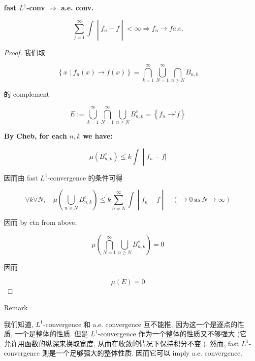 \documentclass{qlnotes-export}
\begin{document}
\begin{proposition}{\textbf{fast \(L^{1}\)-conv \(\Longrightarrow\) a.e. conv.}}\label{prop-05-integration-of-real-and-complex-functions-fast-l-1-conv-implies-a-e-conv}

\[\left. \sum\limits_{j = 1}^{\infty}\int \middle| f_{n} - f \middle| < \infty\Longrightarrow f_{n}\rightarrow f a.e. \right.\]

\end{proposition}

\begin{proof}

我们取

\[\left\{ {x \mid f_{n}(x)\rightarrow f(x)} \right\} = \bigcap\limits_{k = 1}^{\infty}\bigcup\limits_{N = 1}^{\infty}\bigcap\limits_{n \geq N}B_{n,k}\]

的 complement

\[E := \bigcup\limits_{k = 1}^{\infty}\bigcap\limits_{N = 1}^{\infty}\bigcup\limits_{n \geq N}B_{n,k}^{c} = \left\{ {f_{n}\operatorname{\rightarrow\not{}}f} \right\}\]

\textbf{By Cheb, for each \(n,k\) we have:}

\[\left. \mu(B_{n,k}^{c}) \leq k\int \middle| f_{n} - f| \right.\]

因而由 fast \(L^{1}\)-convergence 的条件可得

\[\left. \forall k\forall N,\quad\mu(\bigcup\limits_{n \geq N}B_{n,k}^{c}) \leq k\sum\limits_{n = N}^{\infty}\int \middle| f_{n} - f \middle| \quad(\rightarrow 0\ \text{as}\ N\rightarrow\infty) \right.\]

因而 by ctn from above,

\[\mu(\bigcap\limits_{N = 1}^{\infty}\bigcup\limits_{n \geq N}B_{n,k}^{c}) = 0\]

因而

\[\mu(E) = 0\]

\end{proof}

\begin{qlremark}{Remark}

我们知道, \(L^{1}\)-convergence 和 a.e. convergence 互不能推, 因为这一个是逐点的性质, 一个是整体的性质. 但是 \(L^{1}\)-convergence 作为一个整体的性质又不够强大 (它允许用函数的纵深来换取宽度, 从而在收敛的情况下保持积分不变.). 然而, fast \(L^{1}\)-convergence 则是一个足够强大的整体性质. 因而它可以 imply a.e. convergence.

\end{qlremark}
\end{document}
